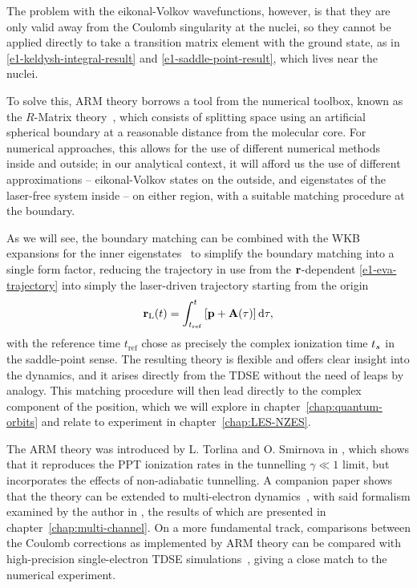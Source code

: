 The problem with the eikonal-Volkov wavefunctions, however, is that they are only valid away from the Coulomb singularity at the nuclei, so they cannot be applied directly to take a transition matrix element with the ground state, as in \eqref{e1-keldysh-integral-result} and \eqref{e1-saddle-point-result}, which lives near the nuclei. 

To solve this, ARM theory borrows a tool from the numerical toolbox, known as the $R$-Matrix theory~\cite{Rmatrix_Wigner, Rmatrix_nuclear_review, Rmatrix_atomic, Rmatrix_molecular, Rmatrix_time_dependent}, which consists of splitting space using an artificial spherical boundary at a reasonable distance from the molecular core. For numerical approaches, this allows for the use of different numerical methods inside and outside; in our analytical context, it will afford us the use of different approximations -- eikonal-Volkov states on the outside, and eigenstates of the laser-free system inside -- on either region, with a suitable matching procedure at the boundary.

As we will see, the boundary matching can be combined with the WKB expansions for the inner eigenstates~\cite{cohen-tannoudji_QM} to simplify the boundary matching into a single form factor, reducing the trajectory in use from the $\vb{r}$-dependent \eqref{e1-eva-trajectory} into simply the laser-driven trajectory starting from the origin
\begin{equation}
\vb{r}_\mathrm{L}(t)
=
\int_{t_\mathrm{ref}}^t \left[\vb{p}+\vb{A}(\tau)\right]\mathrm{d}\tau
,
\label{e1-main-trajectory}
\end{equation}
with the reference time $t_\mathrm{ref}$ chose as precisely the complex ionization time ${t_s}$ in the saddle-point sense. The resulting theory is flexible and offers clear insight into the dynamics, and it arises directly from the TDSE without the need of leaps by analogy. This matching procedure will then lead directly to the complex component of the position, which we will explore in chapter~\ref{chap:quantum-orbits} and relate to experiment in chapter~\ref{chap:LES-NZES}.


The ARM theory was introduced by L. Torlina and O. Smirnova in , which shows that it reproduces the PPT ionization rates in the tunnelling $\gamma\ll 1$ limit, but incorporates the effects of non-adiabatic tunnelling. A companion paper shows that the theory can be extended to multi-electron dynamics~\cite{ ARM_initial_multielectron}, with said formalism examined by the author in , the results of which are presented in chapter~\ref{chap:multi-channel}. On a more fundamental track, comparisons between the Coulomb corrections as implemented by ARM theory can be compared with high-precision single-electron TDSE simulations~\cite{ARM_abinitio_verification}, giving a close match to the numerical experiment.

